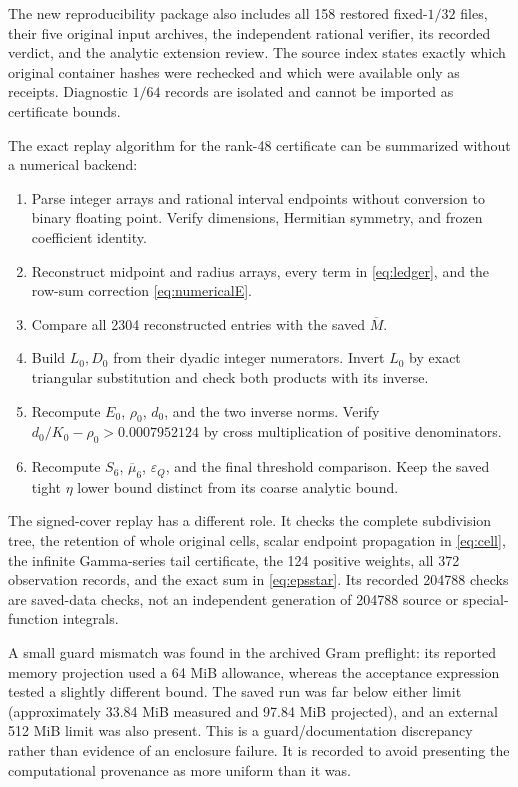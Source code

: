 \documentclass[11pt,a4paper]{article}
\numberwithin{equation}{section}
\theoremstyle{definition}\newtheorem{definition}[theorem]{Definition}
\theoremstyle{remark}\newtheorem{remark}[theorem]{Remark}
\newcommand{\epsQ}{\varepsilon_Q}
\newcommand{\Mbar}{\overline M}
\begin{document}
The new reproducibility package also includes all 158 restored fixed-$1/32$ files, their five original input archives, the independent rational verifier, its recorded verdict, and the analytic extension review. The source index states exactly which original container hashes were rechecked and which were available only as receipts. Diagnostic $1/64$ records are isolated and cannot be imported as certificate bounds.

The exact replay algorithm for the rank-48 certificate can be summarized without a numerical backend:
\begin{enumerate}[leftmargin=2em]
\item Parse integer arrays and rational interval endpoints without conversion to binary floating point. Verify dimensions, Hermitian symmetry, and frozen coefficient identity.
\item Reconstruct midpoint and radius arrays, every term in \eqref{eq:ledger}, and the row-sum correction \eqref{eq:numericalE}.
\item Compare all 2304 reconstructed entries with the saved $\Mbar$.
\item Build $L_0,D_0$ from their dyadic integer numerators. Invert $L_0$ by exact triangular substitution and check both products with its inverse.
\item Recompute $E_0$, $\rho_0$, $d_0$, and the two inverse norms. Verify $d_0/K_0-\rho_0>0.0007952124$ by cross multiplication of positive denominators.
\item Recompute $S_6$, $\overline\mu_6$, $\epsQ$, and the final threshold comparison. Keep the saved tight $\eta$ lower bound distinct from its coarse analytic bound.
\end{enumerate}

The signed-cover replay has a different role. It checks the complete subdivision tree, the retention of whole original cells, scalar endpoint propagation in \eqref{eq:cell}, the infinite Gamma-series tail certificate, the 124 positive weights, all 372 observation records, and the exact sum in \eqref{eq:epsstar}. Its recorded 204788 checks are saved-data checks, not an independent generation of 204788 source or special-function integrals.

A small guard mismatch was found in the archived Gram preflight: its reported memory projection used a 64 MiB allowance, whereas the acceptance expression tested a slightly different bound. The saved run was far below either limit (approximately 33.84 MiB measured and 97.84 MiB projected), and an external 512 MiB limit was also present. This is a guard/documentation discrepancy rather than evidence of an enclosure failure. It is recorded to avoid presenting the computational provenance as more uniform than it was.
\end{document}
